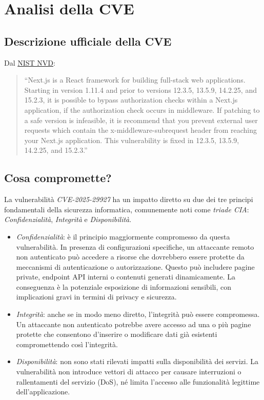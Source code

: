 \documentclass[a4paper,oneside,12pt]{report}
\begin{document}
\chapter{Analisi della CVE}
\label{chap:analisi-cve}

\section{Descrizione ufficiale della CVE}
\label{sec:descrizione-ufficiale-cve}

Dal \href{https://cve.mitre.org/cgi-bin/cvename.cgi?name=CVE-2025-29927}{NIST NVD}:
\begin{quote}
``Next.js is a React framework for building full-stack web applications. Starting in version 1.11.4 and prior to versions 12.3.5, 13.5.9, 14.2.25, and 15.2.3, it is possible to bypass authorization checks within a Next.js application, if the authorization check occurs in middleware. If patching to a safe version is infeasible, it is recommend that you prevent external user requests which contain the x-middleware-subrequest header from reaching your Next.js application. This vulnerability is fixed in 12.3.5, 13.5.9, 14.2.25, and 15.2.3.''
\end{quote}

\section{Cosa compromette?}
\label{sec:cosa-compromette}

La vulnerabilità \emph{CVE-2025-29927} ha un impatto diretto su due dei tre principi fondamentali della sicurezza informatica, comunemente noti come \emph{triade CIA}: \emph{Confidenzialità}, \emph{Integrità} e \emph{Disponibilità}.

\begin{itemize}
  \item \emph{Confidenzialità}: è il principio maggiormente compromesso da questa vulnerabilità. In presenza di configurazioni specifiche, un attaccante remoto non autenticato può accedere a risorse che dovrebbero essere protette da meccanismi di autenticazione o autorizzazione. Questo può includere pagine private, endpoint API interni o contenuti generati dinamicamente. La conseguenza è la potenziale esposizione di informazioni sensibili, con implicazioni gravi in termini di privacy e sicurezza.
  \item \emph{Integrità}: anche se in modo meno diretto, l’integrità può essere compromessa. Un attaccante non autenticato potrebbe avere accesso ad una o pi\`u pagine protette che consentono d'inserire o modificare dati gi\`a esistenti compromettendo cos\`i l'integrit\`a.
  \item \emph{Disponibilità}: non sono stati rilevati impatti sulla disponibilità dei servizi. La vulnerabilità non introduce vettori di attacco per causare interruzioni o rallentamenti del servizio (DoS), né limita l’accesso alle funzionalità legittime dell’applicazione.
\end{itemize}
\end{document}
